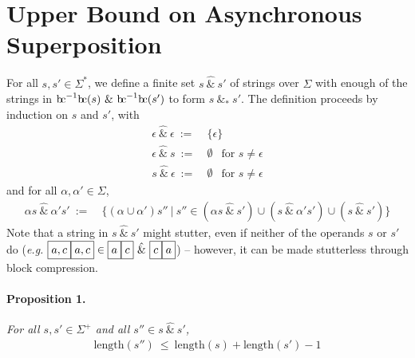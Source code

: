 \documentclass[a4paper,11pt,leqno]{article}
\newcommand{\bc}{{\rm b\!c}}
\newcommand{\vph}[1]{\vphantom{#1}}
\newcommand{\ebox}[1]{\fbox{$\vph{',}#1$}}
\begin{document}
\section{Upper Bound on Asynchronous Superposition}\label{upper}
For all $s,s'\in \Sigma^{\ast}$, we define a finite set
$s~\hat{\&}~s'$ of strings over $\Sigma$ with enough of 
the strings in $\bc^{-1}\bc(s)~\&~\bc^{-1}\bc(s')$
to form $s~\&_*~s'$.
The definition proceeds by induction on $s$ and $s'$, with
\begin{subequations}
\begin{align}
\epsilon\ \hat{\&}\ \epsilon \ :=& \ \{\epsilon\}\\
\epsilon\ \hat{\&}\ s \ :=& \ \emptyset\ \ \mbox{ for } s\neq\epsilon\\
s\ \hat{\&}\ \epsilon \ :=& \ \emptyset\ \ \mbox{ for } s\neq\epsilon
\end{align}
\end{subequations}
and for all $\alpha,\alpha'\in \Sigma$,
\begin{align}
\alpha s~\hat{\&}~\alpha's' \ :=&~\{(\alpha\cup\alpha')s''\ | \ s''\in (\alpha 
s~\hat{\&}~s') \cup 
(s~\hat{\&}~\alpha's') \cup (s~\hat{\&}~s')\}
\end{align}
Note that a string in $s\ \hat{\&}\ s'$ might stutter, even if neither of the 
operands $s$ or $s'$ do
(\textit{e.g.} $\ebox{a,c}\ebox{a,c}\in
\ebox{a}\ebox{c}\ \hat{\&}\ 
\ebox{c}\ebox{a}$)
-- however, it can be made stutterless through block compression.
\paragraph{Proposition 1.} {\sl For all  $s, s' \in \Sigma^+$
	and all $s''\in s\ \hat{\&}\ s'$,}
\begin{align}
\mbox{length}(s'')\ \leq\ \mbox{length}(s) + \mbox{length}(s') -1
\end{align}
\end{document}
